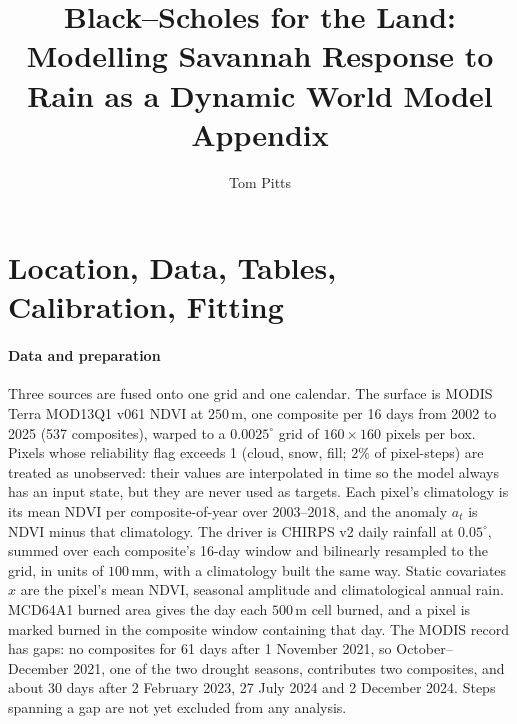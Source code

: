 \documentclass[letterpaper]{article} %
\title{Black--Scholes for the Land:\\ Modelling Savannah Response to Rain as a Dynamic World Model\\ Appendix}
\author{
    Tom Pitts
}
\begin{document}
\maketitle

\section{Location, Data, Tables, Calibration, Fitting}
\paragraph{Data and preparation} Three sources are fused onto one grid and one calendar. The surface is MODIS Terra MOD13Q1 v061 NDVI \citep{mod13} at $250$\,m, one composite per 16 days from 2002 to 2025 (537 composites), warped to a $0.0025^\circ$ grid of $160\times160$ pixels per box. Pixels whose reliability flag exceeds 1 (cloud, snow, fill; $2\%$ of pixel-steps) are treated as unobserved: their values are interpolated in time so the model always has an input state, but they are never used as targets. Each pixel's climatology is its mean NDVI per composite-of-year over 2003--2018, and the anomaly $a_t$ is NDVI minus that climatology. The driver is CHIRPS v2 daily rainfall \citep{chirps} at $0.05^\circ$, summed over each composite's 16-day window and bilinearly resampled to the grid, in units of $100$\,mm, with a climatology built the same way. Static covariates $x$ are the pixel's mean NDVI, seasonal amplitude and climatological annual rain. MCD64A1 burned area \citep{mcd64} gives the day each $500$\,m cell burned, and a pixel is marked burned in the composite window containing that day. The MODIS record has gaps: no composites for 61 days after 1 November 2021, so October--December 2021, one of the two drought seasons, contributes two composites, and about 30 days after 2 February 2023, 27 July 2024 and 2 December 2024. Steps spanning a gap are not yet excluded from any analysis.
\end{document}
